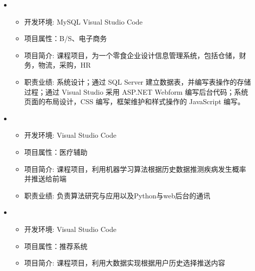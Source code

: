   \begin{itemize}[leftmargin=*]
    \item
      {\small
      \begin{itemize}
        \item 开发环境: MySQL Visual Studio Code
        \item 项目属性：B/S、电子商务
        \item 项目简介: 课程项目，为一个零食企业设计信息管理系统，包括仓储，财务，物流，采购，HR
        \item 职责业绩: 系统设计；通过 SQL Server 建立数据表，并编写表操作的存储过程；通过 Visual Studio 采用 ASP.NET Webform 编写后台代码；系统页面的布局设计，CSS 编写，框架维护和样式操作的 JavaScript 编写。
      \end{itemize}
      }
    \item
      {\small
      \begin{itemize}
        \item 开发环境: Visual Studio Code
        \item 项目属性：医疗辅助
        \item 项目简介: 课程项目，利用机器学习算法根据历史数据推测疾病发生概率并推送给前端
        \item 职责业绩: 负责算法研究与应用以及Python与web后台的通讯
      \end{itemize}
      }
    \item
    {\small
    \begin{itemize}
      \item 开发环境: Visual Studio Code
      \item 项目属性：推荐系统
      \item 项目简介: 课程项目，利用大数据实现根据用户历史选择推送内容

\end{itemize}}
\end{itemize}
